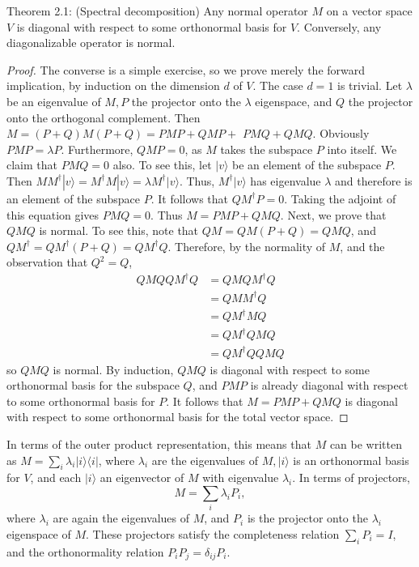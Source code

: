 \begin{theorem}
    Theorem 2.1: (Spectral decomposition) Any normal operator $M$ on a vector space $V$ is diagonal with respect to some orthonormal basis for $V$. Conversely, any diagonalizable operator is normal.
\end{theorem}
\begin{proof}
    The converse is a simple exercise, so we prove merely the forward implication, by induction on the dimension $d$ of $V$. The case $d=1$ is trivial. Let $\lambda$ be an eigenvalue of $M, P$ the projector onto the $\lambda$ eigenspace, and $Q$ the projector onto the orthogonal complement. Then $M=(P+Q) M(P+Q)=P M P+Q M P+$ $P M Q+Q M Q$. Obviously $P M P=\lambda P$. Furthermore, $Q M P=0$, as $M$ takes the subspace $P$ into itself. We claim that $P M Q=0$ also. To see this, let $|v\rangle$ be an element of the subspace $P$. Then $M M^{\dagger}|v\rangle=M^{\dagger} M|v\rangle=\lambda M^{\dagger}|v\rangle$. Thus, $M^{\dagger}|v\rangle$ has eigenvalue $\lambda$ and therefore is an element of the subspace $P$. It follows that $Q M^{\dagger} P=0$. Taking the adjoint of this equation gives $P M Q=0$. Thus $M=P M P+Q M Q$. Next, we prove that $Q M Q$ is normal. To see this, note that $Q M=Q M(P+Q)=Q M Q$, and $Q M^{\dagger}=Q M^{\dagger}(P+Q)=Q M^{\dagger} Q$. Therefore, by the normality of $M$, and the observation that $Q^{2}=Q$,
$$
\begin{aligned}
Q M Q Q M^{\dagger} Q & =Q M Q M^{\dagger} Q \\
& =Q M M^{\dagger} Q \\
& =Q M^{\dagger} M Q \\
& =Q M^{\dagger} Q M Q \\
& =Q M^{\dagger} Q Q M Q
\end{aligned}
$$
so $Q M Q$ is normal. By induction, $Q M Q$ is diagonal with respect to some orthonormal basis for the subspace $Q$, and $P M P$ is already diagonal with respect to some orthonormal basis for $P$. It follows that $M=P M P+Q M Q$ is diagonal with respect to some orthonormal basis for the total vector space.
\end{proof}

In terms of the outer product representation, this means that $M$ can be written as $M=\sum_{i} \lambda_{i}|i\rangle\langle i|$, where $\lambda_{i}$ are the eigenvalues of $M,|i\rangle$ is an orthonormal basis for $V$, and each $|i\rangle$ an eigenvector of $M$ with eigenvalue $\lambda_{i}$. In terms of projectors, 
$$
M=\sum_{i} \lambda_{i} P_{i},
$$
where $\lambda_{i}$ are again the eigenvalues of $M$, and $P_{i}$ is the projector onto the $\lambda_{i}$ eigenspace of $M$. These projectors satisfy the completeness relation $\sum_{i} P_{i}=I$, and the orthonormality relation $P_{i} P_{j}=\delta_{i j} P_{i}$.


